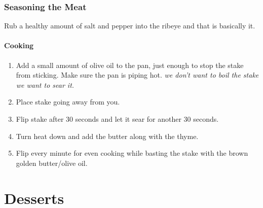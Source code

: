 \subsection{Seasoning the Meat}
Rub a healthy amount of salt and pepper into the ribeye and that is basically it.

\subsubsection{Cooking}
\begin{enumerate}
    \item Add a small amount of olive oil to the pan, just enough to stop the stake from sticking. Make sure the pan is piping hot. \textit{we don't want to boil the stake we want to sear it.}
    \item Place stake going away from you.
    \item Flip stake after 30 seconds and let it sear for another 30 seconds.
    \item Turn heat down and add the butter along with the thyme.
    \item Flip every minute for even cooking while basting the stake with the brown golden butter/olive oil.
\end{enumerate}


\chapter{Desserts}

